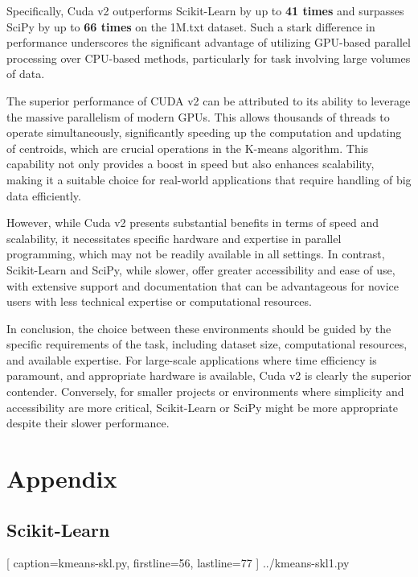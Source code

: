 \documentclass{article}
\begin{document}
  Specifically, {\sc Cuda v2} outperforms {\sc Scikit-Learn} by up to {\bf 41 times}
  and surpasses {\sc SciPy} by up to {\bf 66 times} on the {\sf 1M.txt} dataset. Such a
  stark difference in performance underscores the significant advantage of utilizing
  GPU-based parallel processing over CPU-based methods, particularly for task involving
  large volumes of data. \medskip

  The superior performance of {\sc CUDA v2} can be attributed to its ability to leverage
  the massive parallelism of modern GPUs. This allows thousands of threads to operate
  simultaneously, significantly speeding up the computation and updating of centroids,
  which are crucial operations in the {\sc K-means} algorithm. This capability not only
  provides a boost in speed but also enhances scalability, making it a suitable choice
  for real-world applications that require handling of big data efficiently. \medskip

  However, while {\sc Cuda v2} presents substantial benefits in terms of speed and
  scalability, it necessitates specific hardware and expertise in parallel programming,
  which may not be readily available in all settings. In contrast, {\sc Scikit-Learn}
  and {\sc SciPy}, while slower, offer greater accessibility and ease of use, with
  extensive support and documentation that can be advantageous for novice users with
  less technical expertise or computational resources. \medskip

  In conclusion, the choice between these environments should be guided by the specific
  requirements of the task, including dataset size, computational resources, and available
  expertise. For large-scale applications where time efficiency is paramount, and appropriate
  hardware is available, {\sc Cuda v2} is clearly the superior contender. Conversely, for
  smaller projects or environments where simplicity and accessibility are more critical,
  {\sc Scikit-Learn} or {\sc SciPy} might be more appropriate despite their slower
  performance.

  \printbibliography[heading=bibnumbered]

  \newpage

  \section{Appendix}
  \subsection{\sc Scikit-Learn}
  
    [
      caption={\sf kmeans-skl.py},
      firstline=56,
      lastline=77
    ]
    {../kmeans-skl1.py}
\end{document}
